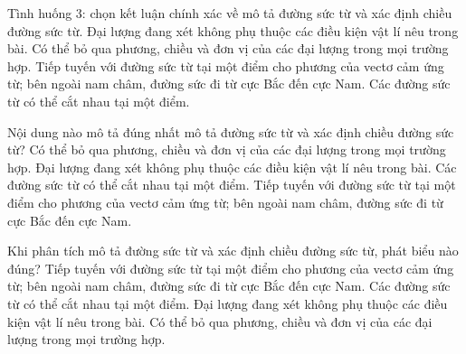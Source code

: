 \begin{ex}
Tình huống 3: chọn kết luận chính xác về mô tả đường sức từ và xác định chiều đường sức từ.
\choice
{Đại lượng đang xét không phụ thuộc các điều kiện vật lí nêu trong bài.}
{Có thể bỏ qua phương, chiều và đơn vị của các đại lượng trong mọi trường hợp.}
{\True Tiếp tuyến với đường sức từ tại một điểm cho phương của vectơ cảm ứng từ; bên ngoài nam châm, đường sức đi từ cực Bắc đến cực Nam.}
{Các đường sức từ có thể cắt nhau tại một điểm.}
\end{ex}

\begin{ex}
Nội dung nào mô tả đúng nhất mô tả đường sức từ và xác định chiều đường sức từ?
\choice
{Có thể bỏ qua phương, chiều và đơn vị của các đại lượng trong mọi trường hợp.}
{Đại lượng đang xét không phụ thuộc các điều kiện vật lí nêu trong bài.}
{Các đường sức từ có thể cắt nhau tại một điểm.}
{\True Tiếp tuyến với đường sức từ tại một điểm cho phương của vectơ cảm ứng từ; bên ngoài nam châm, đường sức đi từ cực Bắc đến cực Nam.}
\end{ex}

\begin{ex}
Khi phân tích mô tả đường sức từ và xác định chiều đường sức từ, phát biểu nào đúng?
\choice
{\True Tiếp tuyến với đường sức từ tại một điểm cho phương của vectơ cảm ứng từ; bên ngoài nam châm, đường sức đi từ cực Bắc đến cực Nam.}
{Các đường sức từ có thể cắt nhau tại một điểm.}
{Đại lượng đang xét không phụ thuộc các điều kiện vật lí nêu trong bài.}
{Có thể bỏ qua phương, chiều và đơn vị của các đại lượng trong mọi trường hợp.}
\end{ex}

